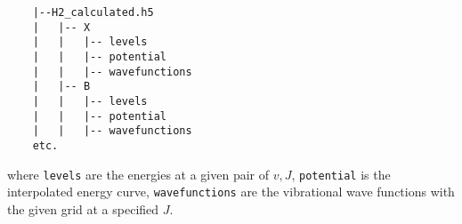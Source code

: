 \begin{verbatim}
    |--H2_calculated.h5
    |   |-- X
    |   |   |-- levels
    |   |   |-- potential
    |   |   |-- wavefunctions
    |   |-- B
    |   |   |-- levels
    |   |   |-- potential
    |   |   |-- wavefunctions
    etc.
\end{verbatim}

where \texttt{levels} are the energies at a given pair of $v,J$, \texttt{potential} is the interpolated energy curve,  \texttt{wavefunctions} are the vibrational wave functions with the given grid at a specified  $J$.






